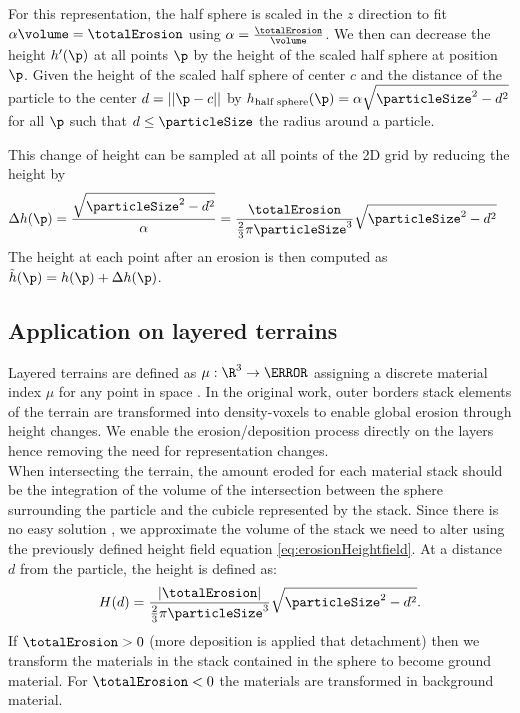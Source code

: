 For this representation, the half sphere is scaled in the $z$ direction to fit $\alpha \volume = \totalErosion$ using $\alpha = \frac{\totalErosion}{\volume}$. We then can decrease the height $h'(\p)$ at all points $\p$ by the height of the scaled half sphere at position $\p$. Given the height of the scaled half sphere of center $c$ and the distance of the particle to the center $d = ||\p - c||$ by $h_\text{half sphere}(\p) = \alpha \sqrt{\particleSize^2 - d^2}$ for all $\p$ such that $d \leq \particleSize$ the radius around a particle.

This change of height can be sampled at all points of the 2D grid by reducing the height by 
\begin{align} 
\label{eq:erosionHeightfield}
\Delta h(\p) &= \frac{\sqrt{\particleSize^2 - d^2}}{\alpha} = \frac{\totalErosion}{\frac{2}{3} \pi \particleSize^3} \sqrt{\particleSize^2 - d^2}
\end{align}
The height at each point after an erosion is then computed as $\Tilde{h}(\p) = h(\p) + \Delta h(\p)$.

\subsection{Application on layered terrains}
\label{sec:erosion_application_on_layers}
Layered terrains are defined as $\mu: \R^3 \to \N$ assigning a discrete material index $\mu$ for any point in space \cite{Benes2001, Peytavie2009}. In the original work, outer borders stack elements of the terrain are transformed into density-voxels to enable global erosion through height changes. We enable the erosion/deposition process directly on the layers hence removing the need for representation changes. \\ 
When intersecting the terrain, the amount eroded for each material stack should be the integration of the volume of the intersection between the sphere surrounding the particle and the cubicle represented by the stack. Since there is no easy solution \cite{Jones2017}, we approximate the volume of the stack we need to alter using the previously defined height field equation \eqref{eq:erosionHeightfield}. 
At a distance $d$ from the particle, the height is defined as:
\begin{align} \label{eq:erosionLayers}
H(d) = \frac{|\totalErosion|}{\frac{2}{3} \pi \particleSize^3} \sqrt{\particleSize^2 - d^2}.
\end{align}
If $\totalErosion > 0$ (more deposition is applied that detachment) then we transform the materials in the stack contained in the sphere to become ground material. For $\totalErosion < 0$ the materials are transformed in background material.

